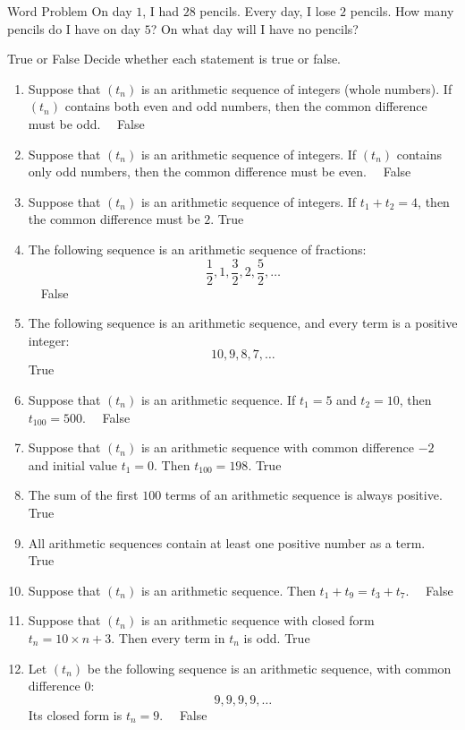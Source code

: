 \documentclass[12pt,letterpaper]{article}
\begin{document}
\begin{problem}{Word Problem}
 On day $1$, I had $28$ pencils. Every day, I lose $2$ pencils. How many
 pencils do I have on day $5$? On what day will I have no pencils?
\end{problem}

\begin{problem}{True or False}
  Decide whether each statement is true or false.

  \begin{enumerate}
    \item Suppose that \((t_n)\) is an arithmetic sequence of integers (whole
    numbers). If \((t_n)\) contains both even and odd numbers, then the common
    difference must be odd.
    \hfill {}~~False
    \item Suppose that \((t_n)\) is an arithmetic sequence of integers. If
    \((t_n)\) contains only odd numbers, then the common difference must be
    even.
    \hfill {}~~False
    \item Suppose that \((t_n)\) is an arithmetic sequence of integers. If
    \(t_1 + t_2 = 4\), then the common difference must be \(2\).
    \hfill True~~
    \item The following sequence is an arithmetic sequence of fractions: \[
      \frac{1}{2}, 1, \frac{3}{2}, 2, \frac{5}{2}, \dots
    \]
    \hfill {}~~False
    \item The following sequence is an arithmetic sequence, and every term is a positive integer: \[
      10, 9, 8, 7, \dots
    \]
    \hfill True~~
    \item Suppose that \((t_n)\) is an arithmetic sequence. If \(t_1 = 5\) and
    \(t_2 = 10\), then \(t_{100} = 500\).
    \hfill {}~~False
    \item Suppose that \((t_n)\) is an arithmetic sequence with common
    difference \(-2\) and initial value \(t_1 = 0\). Then \(t_{100} = 198\).
    \hfill True~~
    \item The sum of the first \(100\) terms of an arithmetic sequence is
    always positive.
    \hfill True~~
    \item All arithmetic sequences contain at least one positive number as a
    term.
    \hfill True~~
    \item Suppose that \((t_n)\) is an arithmetic sequence. Then \(t_1 + t_9 =
    t_3 + t_7\).
    \hfill {}~~False
    \item Suppose that \((t_n)\) is an arithmetic sequence with closed form
    \(t_n = 10 \times n + 3\). Then every term in \(t_n\) is odd.
    \hfill True~~
    \item Let \((t_n)\) be the following sequence is an arithmetic sequence,
    with common difference \(0\): \[
      9, 9, 9, 9, \dots
    \]
    Its closed form is \(t_n = 9\).
    \hfill {}~~False
  \end{enumerate}
\end{problem}
\end{document}
